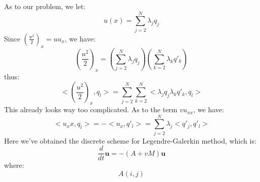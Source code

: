 \documentclass[12pt, fullpage,letterpaper]{article}
\begin{document}
As to our problem, we let:
\begin{equation}
    u(x) = \sum_{j=2}^N \lambda_j q_j
\end{equation}
Since $(\frac{u^2}{2})_x = uu_x$, we have:
\begin{equation}
    (\frac{u^2}{2})_x = (\sum_{j=2}^N \lambda_j q_j) (\sum_{k=2}^N \lambda_k q'_k)
\end{equation}
thus:
\begin{equation}
    <(\frac{u^2}{2})_x, q_l> = \sum_{j=2}^N\sum_{k=2}^N  <\lambda_j q_j\lambda_k q'_k, q_l>
\end{equation}
This already looks way too complicated.
As to the term $vu_{xx}$, we have:
\begin{equation}
    <u_xx, q_l> = -<u_x, q'_l> = \sum_{j=2}^N \lambda_j <q'_j, q'_l>
\end{equation}
Here we've obtained the discrete scheme for Legendre-Galerkin method, which is:
\begin{equation}
    \frac{d}{dt} \mathbf{u} = -(A + vM) \mathbf{u}
\end{equation}
where:
\begin{equation}
    A(i, j)
\end{equation}
\end{document}
